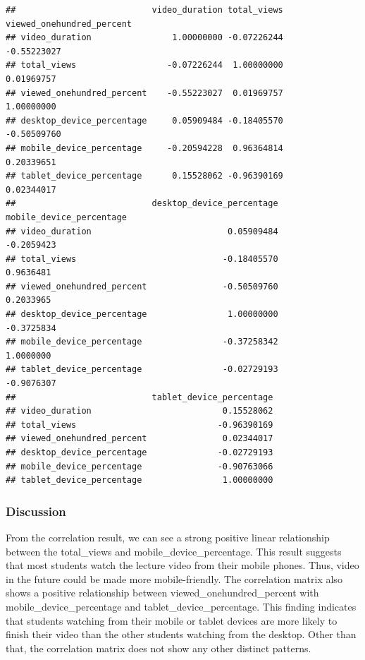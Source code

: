 \documentclass[12pt,]{article}
\begin{document}
\begin{verbatim}
##                           video_duration total_views viewed_onehundred_percent
## video_duration                1.00000000 -0.07226244               -0.55223027
## total_views                  -0.07226244  1.00000000                0.01969757
## viewed_onehundred_percent    -0.55223027  0.01969757                1.00000000
## desktop_device_percentage     0.05909484 -0.18405570               -0.50509760
## mobile_device_percentage     -0.20594228  0.96364814                0.20339651
## tablet_device_percentage      0.15528062 -0.96390169                0.02344017
##                           desktop_device_percentage mobile_device_percentage
## video_duration                           0.05909484               -0.2059423
## total_views                             -0.18405570                0.9636481
## viewed_onehundred_percent               -0.50509760                0.2033965
## desktop_device_percentage                1.00000000               -0.3725834
## mobile_device_percentage                -0.37258342                1.0000000
## tablet_device_percentage                -0.02729193               -0.9076307
##                           tablet_device_percentage
## video_duration                          0.15528062
## total_views                            -0.96390169
## viewed_onehundred_percent               0.02344017
## desktop_device_percentage              -0.02729193
## mobile_device_percentage               -0.90763066
## tablet_device_percentage                1.00000000
\end{verbatim}

\normalsize

\hypertarget{discussion-3}{%
\subsubsection{Discussion}\label{discussion-3}}

From the correlation result, we can see a strong positive linear
relationship between the total\_views and mobile\_device\_percentage.
This result suggests that most students watch the lecture video from
their mobile phones. Thus, video in the future could be made more
mobile-friendly. The correlation matrix also shows a positive
relationship between viewed\_onehundred\_percent with
mobile\_device\_percentage and tablet\_device\_percentage. This finding
indicates that students watching from their mobile or tablet devices are
more likely to finish their video than the other students watching from
the desktop. Other than that, the correlation matrix does not show any
other distinct patterns.
\end{document}
